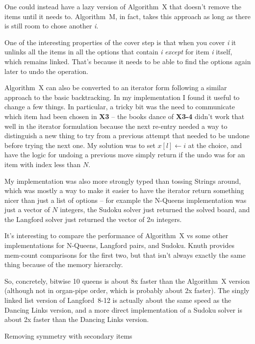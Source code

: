 One could instead have a lazy version of Algorithm~X that doesn't remove the
items until it needs to.  Algorithm~M, in fact, takes this approach as long
as there is still room to chose another {\it i}.

One of the interesting properties of the cover step is that when you
cover {\it i} it unlinks all the items in all the options that contain {\it i}
{\it except} for item {\it i} itself, which remains linked.  That's because
it needs to be able to find the options again later to undo the operation.

Algorithm~X can also be converted to an iterator form following a similar
approach to the basic backtracking.  In my implementation I found it useful
to change a few things.  In particular, a tricky bit was the need to
communicate which item had been chosen in {\bf X3} -- the books dance of
{\bf X3-4} didn't work that well in the iterator formulation because the
next re-entry needed a way to distinguish a new thing to try from a previous
attempt that needed to be undone before trying the next one.  My solution was
to set $x\left[l\right] \leftarrow i$ at the choice, and have the logic for
undoing a previous move simply return if the undo was for an item with index
less than $N$.

My implementation was also more strongly typed than tossing Strings around,
which was mostly a way to make it easier to have the iterator return something
nicer than just a list of options -- for example the N-Queens implementation
was just a vector of $N$ integers, the Sudoku solver just returned the solved
board, and the Langford solver just returned the vector of $2n$ integers.

It's interesting to compare the performance of Algorithm~X vs some other
implementations for N-Queens, Langford pairs, and Sudoku.  Knuth provides
mem-count comparisons for the first two, but that isn't always exactly the
same thing because of the memory hierarchy.

So, concretely, bitwise 10 queens is about 8x faster than the Algorithm~X version
(although not in organ-pipe order, which is probably about 2x faster).
The singly linked list version of Langford~8-12 is actually about the same
speed as the Dancing Links version, and a more direct implementation of a Sudoku
solver is about 2x faster than the Dancing Links version.


 Removing symmetry with secondary items

